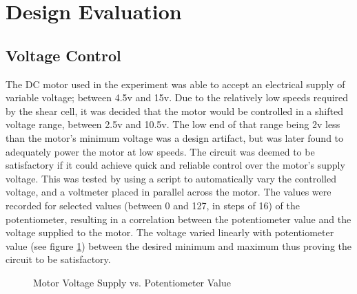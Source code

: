 \documentclass[a4]{report}
\begin{document}
	\section{Design Evaluation}
	
	\subsection{Voltage Control} %
	The DC motor used in the experiment was able to accept an electrical supply of variable voltage; between 4.5v and 15v. Due to the relatively low speeds required by the shear cell, it was decided that the motor would be controlled in a shifted voltage range, between 2.5v and 10.5v. 
The low end of that range being 2v less than the motor's minimum voltage was a design artifact, but was later found to adequately power the motor at low speeds. %
The circuit was deemed to be satisfactory if it could achieve quick and reliable control over the motor's supply voltage. This was tested by using a script to automatically vary the controlled voltage, and a voltmeter placed in parallel across the motor. The values were recorded for selected values (between 0 and 127, in steps of 16) of the potentiometer, resulting in a correlation between the potentiometer value and the voltage supplied to the motor. The voltage varied linearly with potentiometer value (see figure \ref{figvoltvval}) between the desired minimum and maximum thus proving the circuit to be satisfactory.
	\begin{figure}[!htb]
		\centering
		\caption{Motor Voltage Supply vs. Potentiometer Value}
		\label{figvoltvval}
	\end{figure} \newline  \noindent
\end{document}
